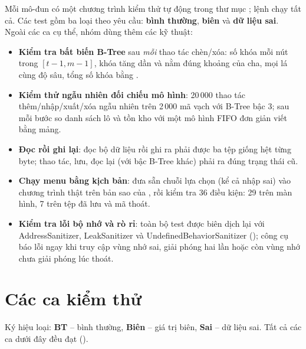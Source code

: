 Mỗi mô-đun có một chương trình kiểm thử tự động trong thư mục ; lệnh  chạy tất cả.
Các test gồm ba loại theo yêu cầu: \textbf{bình thường}, \textbf{biên} và \textbf{dữ liệu sai}. Ngoài các ca
cụ thể, nhóm dùng thêm các kỹ thuật:

\begin{itemize}
  \item \textbf{Kiểm tra bất biến B-Tree} sau \emph{mỗi} thao tác chèn/xóa: số khóa mỗi nút trong
        $[t-1, m-1]$, khóa tăng dần và nằm đúng khoảng của cha, mọi lá cùng độ sâu, tổng số khóa bằng .
  \item \textbf{Kiểm thử ngẫu nhiên đối chiếu mô hình}: 20\,000 thao tác thêm/nhập/xuất/xóa ngẫu nhiên trên
        2\,000 mã vạch với B-Tree bậc 3; sau mỗi bước so danh sách lô và tồn kho với một mô hình FIFO đơn giản viết
        bằng mảng.
  \item \textbf{Đọc rồi ghi lại}: đọc bộ dữ liệu rồi ghi ra phải được ba tệp giống hệt từng byte; thao tác, lưu,
        đọc lại (với bậc B-Tree khác) phải ra đúng trạng thái cũ.
  \item \textbf{Chạy menu bằng kịch bản}:  đưa sẵn chuỗi lựa chọn (kể cả nhập sai) vào
        chương trình thật trên bản sao của , rồi kiểm tra 36 điều kiện: 29 trên màn hình, 7 trên tệp đã lưu và mã thoát.
  \item \textbf{Kiểm tra lỗi bộ nhớ và rò rỉ}: toàn bộ test được biên dịch lại với AddressSanitizer,
        LeakSanitizer và UndefinedBehaviorSanitizer (); công cụ báo lỗi ngay khi
        truy cập vùng nhớ sai, giải phóng hai lần hoặc còn vùng nhớ chưa giải phóng lúc thoát.
\end{itemize}

\section{Các ca kiểm thử}

Ký hiệu loại: \textbf{BT} -- bình thường, \textbf{Biên} -- giá trị biên, \textbf{Sai} -- dữ liệu sai.
Tất cả các ca dưới đây đều đạt (\ok).

